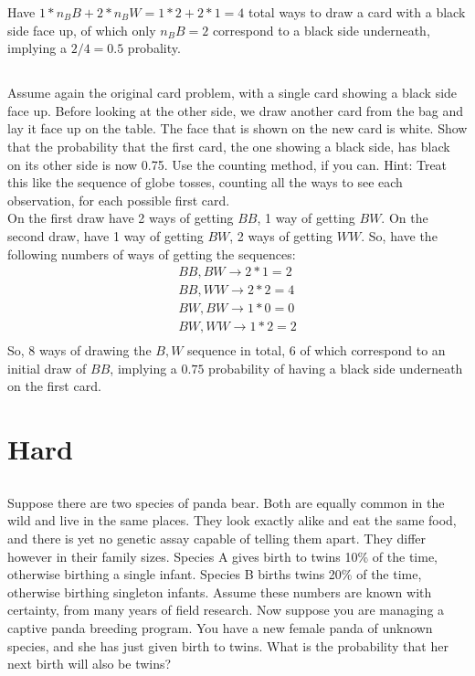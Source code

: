 \documentclass{article}
\begin{document}
Have $1 * n_BB + 2 * n_BW = 1 * 2 + 2 * 1 = 4$ total ways to draw a card
with a black side face up, of which only $n_BB = 2$ correspond to a black side
underneath, implying a $2/4 = 0.5$ probality.

\subsection{}
Assume again the original card problem, with a single card showing a black side
face up.  Before looking at the other side, we draw another card from the bag
and lay it face up on the table. The face that is shown on the new card is white.
Show that the probability that the first card, the one showing a black side, has
black on its other side is now 0.75. Use the counting method, if you can.
Hint: Treat this like the sequence of globe tosses, counting all the ways to see
each observation, for each possible first card. \\

On the first draw have 2 ways of getting $BB$, 1 way of getting $BW$. On the
second draw, have 1 way of getting $BW$, 2 ways of getting $WW$.
So, have the following numbers of ways of getting the sequences:
\begin{gather}
  BB, BW \rightarrow 2 * 1 = 2 \\
  BB, WW \rightarrow 2 * 2 = 4 \\
  BW, BW \rightarrow 1 * 0 = 0 \\
  BW, WW \rightarrow 1 * 2 = 2 \\
\end{gather}
So, 8 ways of drawing the $B, W$ sequence in total, 6 of which correspond to an
initial draw of $BB$, implying a $0.75$ probability of having a black side
underneath on the first card.

\pagebreak
\section{Hard}

\subsection{}
Suppose there are two species of panda bear. Both are equally common in the wild
and live in the same places. They look exactly alike and eat the same food, and
there is yet no genetic assay capable of telling them apart. They differ however
in their family sizes. Species A gives birth to twins 10\% of the time, otherwise
birthing a single infant. Species B births twins 20\% of the time, otherwise
birthing singleton infants. Assume these numbers are known with certainty, from
many years of field research.
Now suppose you are managing a captive panda breeding program. You have a new
female panda of unknown species, and she has just given birth to twins. What is
the probability that her next birth will also be twins? \\
\end{document}
